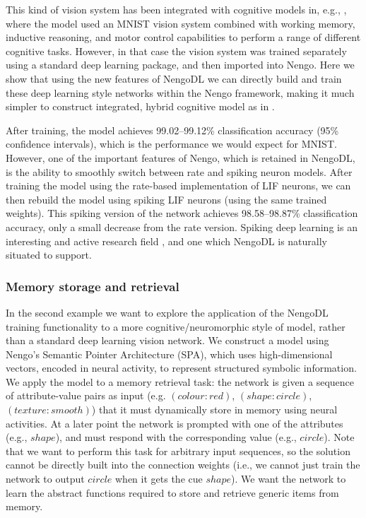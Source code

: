\documentclass{article}
\begin{document}
This kind of vision system has been integrated with cognitive models in, e.g., \citet{Eliasmith2012a}, where the model used an MNIST vision system combined with working memory, inductive reasoning, and motor control capabilities to perform a range of different cognitive tasks.  However, in that case the vision system was trained separately using a standard deep learning package, and then imported into Nengo.  Here we show that using the new features of NengoDL we can directly build and train these deep learning style networks within the Nengo framework, making it much simpler to construct integrated, hybrid cognitive model as in \citet{Eliasmith2012a}.

After training, the model achieves 99.02--99.12\% classification accuracy (95\% confidence intervals), which is the performance we would expect for MNIST.  However, one of the important features of Nengo, which is retained in NengoDL, is the ability to smoothly switch between rate and spiking neuron models.  After training the model using the rate-based implementation of LIF neurons, we can then rebuild the model using spiking LIF neurons (using the same trained weights).  This spiking version of the network achieves 98.58--98.87\% classification accuracy, only a small decrease from the rate version.  Spiking deep learning is an interesting and active research field \citep{Hunsberger2015,Lee2016}, and one which NengoDL is naturally situated to support.

\subsubsection{Memory storage and retrieval}

In the second example we want to explore the application of the NengoDL training functionality to a more cognitive/neuromorphic style of model, rather than a standard deep learning vision network.  We construct a model using Nengo's Semantic Pointer Architecture (SPA), which uses high-dimensional vectors, encoded in neural activity, to represent structured symbolic information.  We apply the model to a memory retrieval task: the network is given a sequence of attribute-value pairs as input (e.g. $(colour: red)$, $(shape: circle)$, $(texture: smooth)$) that it must dynamically store in memory using neural activities.  At a later point the network is prompted with one of the attributes (e.g., $shape$), and must respond with the corresponding value (e.g., $circle$).  Note that we want to perform this task for arbitrary input sequences, so the solution cannot be directly built into the connection weights (i.e., we cannot just train the network to output $circle$ when it gets the cue $shape$).  We want the network to learn the abstract functions required to store and retrieve generic items from memory.
\end{document}
